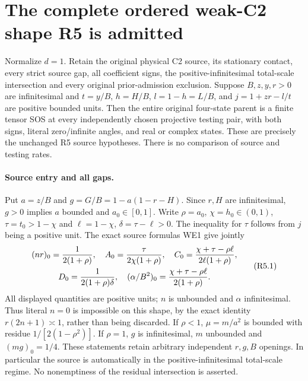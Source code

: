 \section{The complete ordered weak-C2 shape R5 is admitted}
\label{sec:r17-r5}

\begin{theorem}
Normalize $d=1$. Retain the original physical C2 source, its stationary contact, every strict
source gap, all coefficient signs, the positive-infinitesimal total-scale
intersection and every original prior-admission exclusion. Suppose
$B,z,y,r>0$ are infinitesimal and $t=y/B$, $h=H/B$, $l=1-h=L/B$,
and $j=1+zr-l/t$ are positive bounded units. Then the entire original
four-state parent is a finite tensor SOS at every independently chosen
projective testing pair, with both signs, literal zero/infinite angles,
and real or complex states. These are precisely the unchanged R5 source
hypotheses. There is no comparison of source and testing rates.
\end{theorem}

\paragraph{Source entry and all gaps.}
Put $a=z/B$ and $g=G/B=1-a(1-r-H)$. Since $r,H$ are infinitesimal,
$g>0$ implies $a$ bounded and $a_0\in[0,1]$. Write $\rho=a_0$,
$\chi=h_0\in(0,1)$, $\tau=t_0>1-\chi$ and $\ell=1-\chi$,
$\delta=\tau-\ell>0$. The inequality for $\tau$ follows from $j$
being a positive unit. The exact source formulas WE1 give jointly
\[
\begin{gathered}
 (nr)_0={1\over2(1+\rho)},\quad
 A_0={\tau\over2\chi(1+\rho)},\quad
 C_0={\chi+\tau-\rho\ell\over2\ell(1+\rho)},\\
 D_0={1\over2(1+\rho)\delta},\quad
 (\alpha/B^2)_0={\chi+\tau-\rho\ell\over2(1+\rho)}.
\end{gathered}       \tag{R5.1}
\]
All displayed quantities are positive units; $n$ is unbounded and
$\alpha$ infinitesimal. Thus literal $n=0$ is impossible on this shape,
by the exact identity $r(2n+1)\asymp1$, rather than being discarded.
If $\rho<1$, $\mu=m/a^2$ is bounded with residue
$1/[2(1-\rho^2)]$. If $\rho=1$, $g$ is infinitesimal,
$m$ unbounded and $(mg)_0=1/4$. These statements retain arbitrary
independent $r,g,B$ openings. In particular the source is automatically
in the positive-infinitesimal total-scale regime. No nonemptiness of
the residual intersection is asserted.


